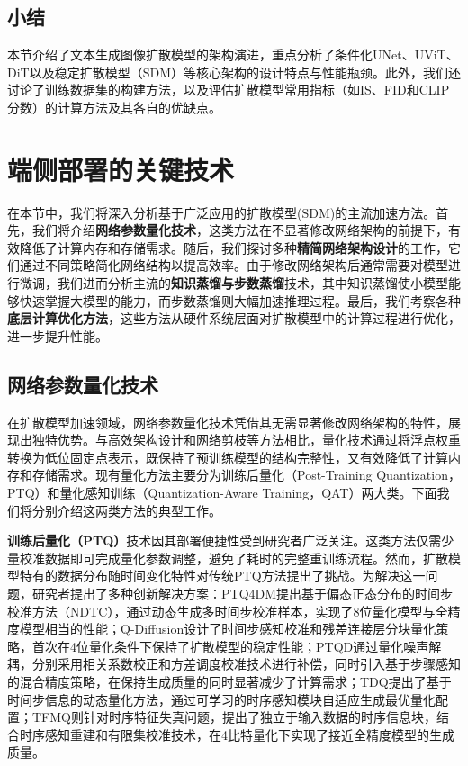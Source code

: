 \documentclass[11pt,a4paper,UTF8]{ctexart}
\begin{document}
\subsection{小结}

本节介绍了文本生成图像扩散模型的架构演进，重点分析了条件化UNet、UViT、DiT以及稳定扩散模型（SDM）等核心架构的设计特点与性能瓶颈。此外，我们还讨论了训练数据集的构建方法，以及评估扩散模型常用指标（如IS、FID和CLIP分数）的计算方法及其各自的优缺点。


\newpage

\section{端侧部署的关键技术}

在本节中，我们将深入分析基于广泛应用的扩散模型(SDM)的主流加速方法。首先，我们将介绍\textbf{网络参数量化技术}，这类方法在不显著修改网络架构的前提下，有效降低了计算内存和存储需求。随后，我们探讨多种\textbf{精简网络架构设计}的工作，它们通过不同策略简化网络结构以提高效率。由于修改网络架构后通常需要对模型进行微调，我们进而分析主流的\textbf{知识蒸馏与步数蒸馏}技术，其中知识蒸馏使小模型能够快速掌握大模型的能力，而步数蒸馏则大幅加速推理过程。最后，我们考察各种\textbf{底层计算优化方法}，这些方法从硬件系统层面对扩散模型中的计算过程进行优化，进一步提升性能。


\subsection{网络参数量化技术}

在扩散模型加速领域，网络参数量化技术凭借其无需显著修改网络架构的特性，展现出独特优势。与高效架构设计和网络剪枝等方法相比，量化技术通过将浮点权重转换为低位固定点表示\cite{gholami2022survey,jin2022fnet}，既保持了预训练模型的结构完整性，又有效降低了计算内存和存储需求。现有量化方法主要分为训练后量化（Post-Training Quantization，PTQ）和量化感知训练（Quantization-Aware Training，QAT）两大类。下面我们将分别介绍这两类方法的典型工作。

\textbf{训练后量化（PTQ）}技术因其部署便捷性受到研究者广泛关注。这类方法仅需少量校准数据即可完成量化参数调整，避免了耗时的完整重训练流程。然而，扩散模型特有的数据分布随时间变化特性对传统PTQ方法提出了挑战。为解决这一问题，研究者提出了多种创新解决方案：PTQ4DM\cite{shang2023post}提出基于偏态正态分布的时间步校准方法（NDTC），通过动态生成多时间步校准样本，实现了8位量化模型与全精度模型相当的性能；Q-Diffusion\cite{li2023q}设计了时间步感知校准和残差连接层分块量化策略，首次在4位量化条件下保持了扩散模型的稳定性能；PTQD\cite{he2023ptqd}通过量化噪声解耦，分别采用相关系数校正和方差调度校准技术进行补偿，同时引入基于步骤感知的混合精度策略，在保持生成质量的同时显著减少了计算需求；TDQ\cite{so2023temporal}提出了基于时间步信息的动态量化方法，通过可学习的时序感知模块自适应生成最优量化配置；TFMQ\cite{Huang_2024_CVPR}则针对时序特征失真问题，提出了独立于输入数据的时序信息块，结合时序感知重建和有限集校准技术，在4比特量化下实现了接近全精度模型的生成质量。
\end{document}

